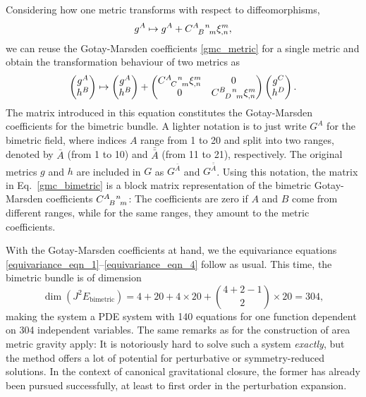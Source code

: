 Considering how one metric transforms with respect to diffeomorphisms,
\begin{equation}
  g^A \mapsto g^A + \gmc{A}{B}{n}{m}\xi^m_{,n},
\end{equation}
we can reuse the Gotay-Marsden coefficients \eqref{gmc_metric} for a single metric and obtain the transformation behaviour of two metrics as
\begin{equation}\label{gmc_bimetric}
  \begin{pmatrix}g^A \\ h^B\end{pmatrix} \mapsto \begin{pmatrix}g^A \\ h^B\end{pmatrix} + \begin{pmatrix}\gmc{A}{C}{n}{m}\xi^m_{,n} & 0 \\ 0 & \gmc{B}{D}{n}{m}\xi^m_{,n}\end{pmatrix} \begin{pmatrix}g^C \\ h^D\end{pmatrix}.
\end{equation}
The matrix introduced in this equation constitutes the Gotay-Marsden coefficients for the bimetric bundle. A lighter notation is to just write $G^A$ for the bimetric field, where indices $A$ range from 1 to 20 and split into two ranges, denoted by $\bar A$ (from 1 to 10) and $\bar{\bar A}$ (from 11 to 21), respectively. The original metrics $g$ and $h$ are included in $G$ as $G^{\bar A}$ and $G^{\bar{\bar A}}$. Using this notation, the matrix in Eq.~\ref{gmc_bimetric} is a block matrix representation of the bimetric Gotay-Marsden coefficients $\gmc{A}{B}{n}{m}$: The coefficients are zero if $A$ and $B$ come from different ranges, while for the same ranges, they amount to the metric coefficients.

With the Gotay-Marsden coefficients at hand, we the equivariance equations \eqref{equivariance_eqn_1}--\eqref{equivariance_eqn_4} follow as usual. This time, the bimetric bundle is of dimension
\begin{equation}
  \operatorname{dim}(J^2E_\text{bimetric}) = 4 + 20 + 4\times 20 + \binom{4 + 2 - 1}{2}\times 20 = 304,
\end{equation}
making the system a PDE system with 140 equations for one function dependent on 304 independent variables. The same remarks as for the construction of area metric gravity apply: It is notoriously hard to solve such a system \emph{exactly}, but the method offers a lot of potential for perturbative or symmetry-reduced solutions. In the context of canonical gravitational closure, the former has already been pursued successfully, at least to first order in the perturbation expansion\cite{wierzba,beier}.

